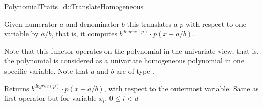 \begin{ccRefConcept}{PolynomialTraits_d::TranslateHomogeneous}
\ccDefinition

Given numerator $a$ and denominator $b$ this  translates a 
 $p$ with respect to one variable by $a/b$, 
that is, it computes $b^{degree(p)}\cdot p(x+a/b)$. 

Note that this functor operates on the polynomial in the univariate view, that is, 
the polynomial is considered as a univariate homogeneous polynomial in one specific variable. 
Note that $a$ and $b$ are of type .


\ccRefines 
{}

\ccTypes

\ccGlue

\ccOperations
{}
         { Returns $b^{degree(p)}\cdot p(x+a/b)$, 
        with respect to the outermost variable. }
         { Same as first operator but for variable $x_i$.
           \ccPrecond $0 \leq i  < d$ 
         }


\ccSeeAlso

\\
\\

\end{ccRefConcept}
